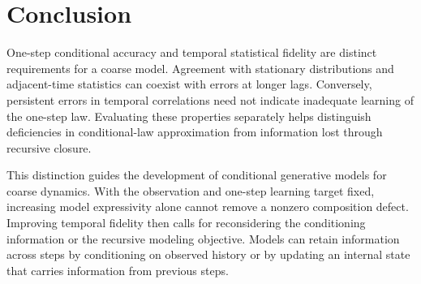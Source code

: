 \documentclass[final,hidelinks]{siamart251216}
\newcommand{\Law}{\operatorname{Law}}
\begin{document}

\section{Conclusion}
\label{sec:conclusion}

One-step conditional accuracy and temporal statistical fidelity are distinct requirements for a coarse model. Agreement with stationary distributions and adjacent-time statistics can coexist with errors at
longer lags. Conversely, persistent errors in temporal correlations need not indicate inadequate learning of the one-step law. Evaluating these properties separately helps distinguish deficiencies in conditional-law approximation from information lost through recursive closure.

This distinction guides the development of conditional generative models for coarse dynamics. With the observation and one-step learning target fixed, increasing model expressivity alone cannot remove a nonzero composition defect. Improving temporal fidelity then calls for reconsidering the conditioning information or the recursive modeling objective. Models can retain information across steps by conditioning on observed history or by updating an internal state that carries information from previous steps.
\end{document}
